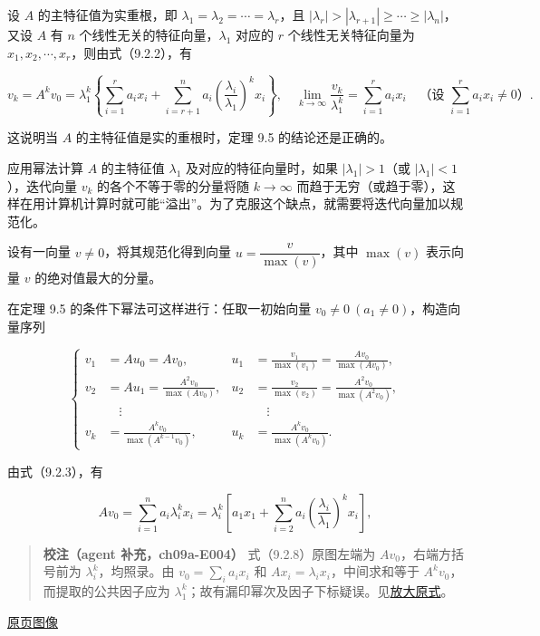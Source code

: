 \documentclass[
  10pt,
  fontset=fandol]{ctexart}
\begin{document}
设 \(A\) 的主特征值为实重根，即 \(\lambda_1=\lambda_2=\cdots=\lambda_r\)，且 \(|\lambda_r|>|\lambda_{r+1}|\geq\cdots\geq|\lambda_n|\)，又设 \(A\) 有 \(n\) 个线性无关的特征向量，\(\lambda_1\) 对应的 \(r\) 个线性无关特征向量为 \(x_1,x_2,\cdots,x_r\)，则由式（9.2.2），有

\[
v_k=A^kv_0=\lambda_1^k\left\{\sum_{i=1}^ra_ix_i+\sum_{i=r+1}^na_i\left(\frac{\lambda_i}{\lambda_1}\right)^kx_i\right\},\quad
\lim_{k\to\infty}\frac{v_k}{\lambda_1^k}=\sum_{i=1}^ra_ix_i\quad\text{（设 }\sum_{i=1}^ra_ix_i\ne0\text{）}.
\]

这说明当 \(A\) 的主特征值是实的重根时，定理 9.5 的结论还是正确的。

应用幂法计算 \(A\) 的主特征值 \(\lambda_1\) 及对应的特征向量时，如果 \(|\lambda_1|>1\)（或 \(|\lambda_1|<1\)），迭代向量 \(v_k\) 的各个不等于零的分量将随 \(k\to\infty\) 而趋于无穷（或趋于零），这样在用计算机计算时就可能``溢出''。为了克服这个缺点，就需要将迭代向量加以规范化。

设有一向量 \(v\ne0\)，将其规范化得到向量 \(u=\dfrac{v}{\max(v)}\)，其中 \(\max(v)\) 表示向量 \(v\) 的绝对值最大的分量。

在定理 9.5 的条件下幂法可这样进行：任取一初始向量 \(v_0\ne0\ (a_1\ne0)\)，构造向量序列

\[
\left\{
\begin{aligned}
v_1&=Au_0=Av_0,&u_1&=\frac{v_1}{\max(v_1)}=\frac{Av_0}{\max(Av_0)},\\
v_2&=Au_1=\frac{A^2v_0}{\max(Av_0)},&u_2&=\frac{v_2}{\max(v_2)}=\frac{A^2v_0}{\max(A^2v_0)},\\
&\quad\vdots&&\quad\vdots\\
v_k&=\frac{A^kv_0}{\max(A^{k-1}v_0)},&u_k&=\frac{A^kv_0}{\max(A^kv_0)}.
\end{aligned}
\right.
\]

由式（9.2.3），有

\[
Av_0=\sum_{i=1}^na_i\lambda_i^kx_i=\lambda_i^k\left[a_1x_1+\sum_{i=2}^na_i\left(\frac{\lambda_i}{\lambda_1}\right)^kx_i\right],
\tag{9.2.8}
\]

\begin{quote}
\textbf{校注（agent 补充，ch09a-E004）} 式（9.2.8）原图左端为 \(Av_0\)，右端方括号前为 \(\lambda_i^k\)，均照录。由 \(v_0=\sum_i a_ix_i\) 和 \(Ax_i=\lambda_ix_i\)，中间求和等于 \(A^kv_0\)，而提取的公共因子应为 \(\lambda_1^k\)；故有漏印幂次及因子下标疑误。见\href{../assets/ch09a/review-p236-9-2-8.png}{放大原式}。
\end{quote}

\href{../../source-images/pdf-237.jpeg}{原页图像}
\end{document}
